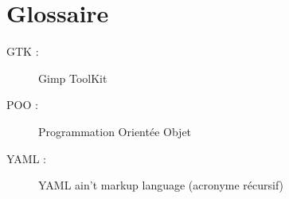 \documentclass[11pt]{article}
\begin{document}

\section{Glossaire}

\begin{description}
\item [GTK : ]Gimp ToolKit
\item [POO : ]Programmation Orientée Objet
\item [YAML : ]YAML ain't markup language (acronyme récursif)
\end{description}

\renewcommand{\thefootnote}{\*} %
\end{document}
